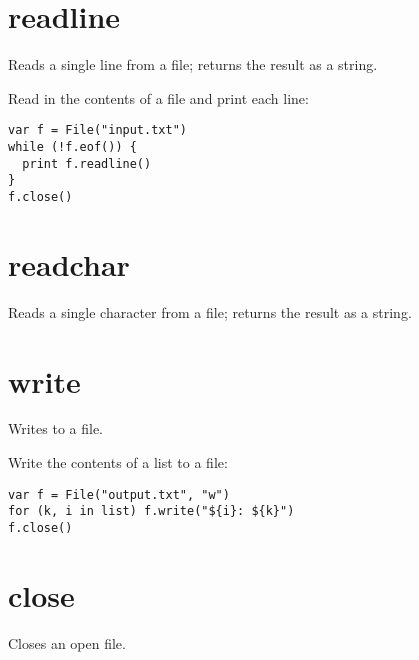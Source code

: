 \hypertarget{readline}{%
\section{readline}\label{readline}}

Reads a single line from a file; returns the result as a string.

Read in the contents of a file and print each line:

\begin{lstlisting}
var f = File("input.txt")
while (!f.eof()) {
  print f.readline()
}
f.close()
\end{lstlisting}

\hypertarget{readchar}{%
\section{readchar}\label{readchar}}

Reads a single character from a file; returns the result as a string.

\hypertarget{write}{%
\section{write}\label{write}}

Writes to a file.

Write the contents of a list to a file:

\begin{lstlisting}
var f = File("output.txt", "w")
for (k, i in list) f.write("${i}: ${k}")
f.close()
\end{lstlisting}

\hypertarget{close}{%
\section{close}\label{close}}

Closes an open file.

